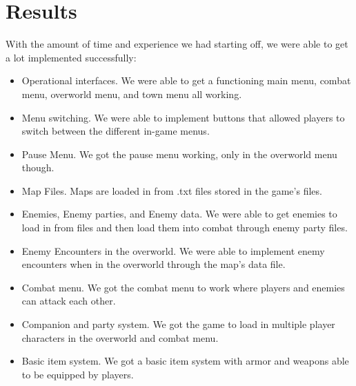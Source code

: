\documentclass[10pt,conference,onecolumn,compsoc]{IEEEtran}
\begin{document}
\section{Results}
With the amount of time and experience we had starting off, we were able to get a lot implemented successfully:
\begin{itemize}
\item Operational interfaces. We were able to get a functioning main menu, combat menu, overworld menu, and town menu all working.
\item Menu switching. We were able to implement buttons that allowed players to switch between the different in-game menus.
\item Pause Menu. We got the pause menu working, only in the overworld menu though.
\item Map Files. Maps are loaded in from .txt files stored in the game's files.
\item Enemies, Enemy parties, and Enemy data. We were able to get enemies to load in from files and then load them into combat through enemy party files.
\item Enemy Encounters in the overworld. We were able to implement enemy encounters when in the overworld through the map's data file.
\item Combat menu. We got the combat menu to work where players and enemies can attack each other.
\item Companion and party system. We got the game to load in multiple player characters in the overworld and combat menu.
\item Basic item system. We got a basic item system with armor and weapons able to be equipped by players.
\end{itemize}
\end{document}
